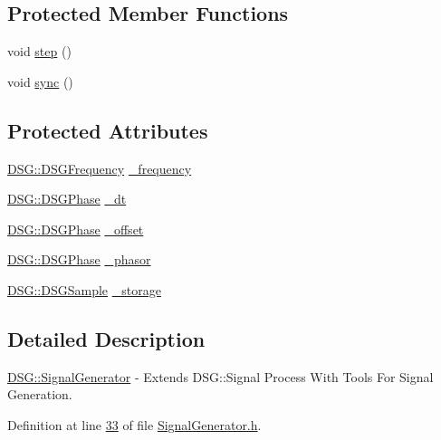 \subsection*{Protected Member Functions}
\begin{DoxyCompactItemize}
\item 
void \hyperlink{class_d_s_g_1_1_signal_generator_a4c034c5b9ef3dc7548839288355643d5}{step} ()
\item 
void \hyperlink{class_d_s_g_1_1_signal_generator_a7070f6be04dfd70170328e908b759cd3}{sync} ()
\end{DoxyCompactItemize}
\subsection*{Protected Attributes}
\begin{DoxyCompactItemize}
\item 
\hyperlink{namespace_d_s_g_a4315a061386fa1014fda09b15d3a6973}{D\+S\+G\+::\+D\+S\+G\+Frequency} \hyperlink{class_d_s_g_1_1_signal_generator_a335e7ef058848eca368be51d8544d143}{\+\_\+frequency}
\item 
\hyperlink{namespace_d_s_g_a44431ce1eb0a7300efdd207bc879e52c}{D\+S\+G\+::\+D\+S\+G\+Phase} \hyperlink{class_d_s_g_1_1_signal_generator_a01c046bb52bbb74afd789fdce7978f65}{\+\_\+dt}
\item 
\hyperlink{namespace_d_s_g_a44431ce1eb0a7300efdd207bc879e52c}{D\+S\+G\+::\+D\+S\+G\+Phase} \hyperlink{class_d_s_g_1_1_signal_generator_a12850f2c05838e2234602bd4fde87732}{\+\_\+offset}
\item 
\hyperlink{namespace_d_s_g_a44431ce1eb0a7300efdd207bc879e52c}{D\+S\+G\+::\+D\+S\+G\+Phase} \hyperlink{class_d_s_g_1_1_signal_generator_a1e23eb94e204b11db75fca030b951065}{\+\_\+phasor}
\item 
\hyperlink{namespace_d_s_g_ac39a94cd27ebcd9c1e7502d0c624894a}{D\+S\+G\+::\+D\+S\+G\+Sample} \hyperlink{class_d_s_g_1_1_signal_generator_a28a9b47a1aa0783029f11a19ba0363f2}{\+\_\+storage}
\end{DoxyCompactItemize}


\subsection{Detailed Description}
\hyperlink{class_d_s_g_1_1_signal_generator}{D\+S\+G\+::\+Signal\+Generator} -\/ Extends D\+S\+G\+::\+Signal Process With Tools For Signal Generation. 

Definition at line \hyperlink{_signal_generator_8h_source_l00033}{33} of file \hyperlink{_signal_generator_8h_source}{Signal\+Generator.\+h}.



